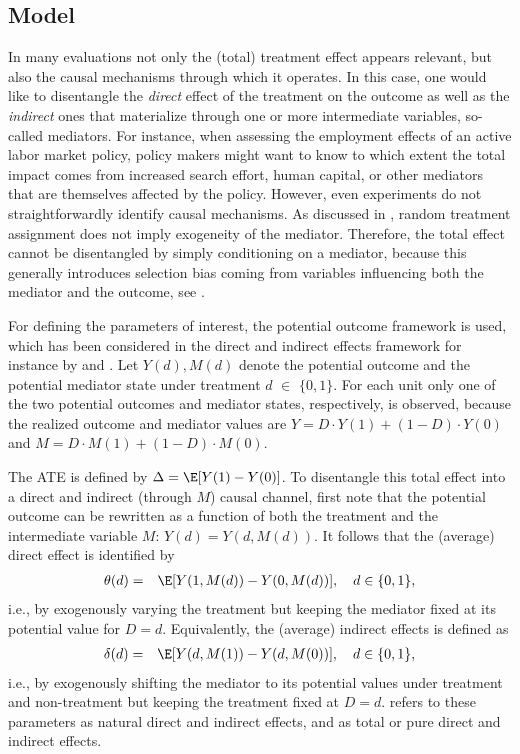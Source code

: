 \documentclass[nojss]{jss}
\begin{document}
\subsection{Model}\label{medmodel}

In many evaluations not only the (total) treatment effect appears relevant, but also the causal mechanisms through which it operates. In this case, one would like to disentangle the \emph{direct} effect of the treatment on the outcome as well as the \emph{indirect} ones that materialize through one or more intermediate variables, so-called mediators. For instance, when assessing the employment effects of an active labor market policy, policy makers might want to know to which extent the total impact comes from increased search effort, human capital, or other mediators that are themselves affected by the policy. However, even experiments do not straightforwardly identify causal mechanisms. As discussed in \citet{RoGr92}, random treatment assignment does not imply exogeneity of the mediator. Therefore, the total effect cannot be disentangled by simply conditioning on a mediator, because this generally introduces selection bias coming from variables influencing both the mediator and the outcome, see \citet{Rosenbaum84}.

For defining the parameters of interest, the potential outcome framework is used, which has been considered in the direct and indirect effects framework for instance by \citet{Ru04} and \citet{Albert2008}. Let $Y(d), M(d)$ denote the potential outcome and the potential mediator state under treatment $d$ $\in$ $\{0,1\}$. For each unit only one of the two potential outcomes and mediator states, respectively, is observed, because the realized outcome and mediator values are $Y=D\cdot Y(1) + (1-D)\cdot Y(0)$ and $M=D\cdot M(1) + (1-D)\cdot M(0)$.

The ATE is defined by $\Delta=\E[Y(1)-Y(0)]$. To disentangle this total effect into a direct and indirect (through $M$) causal channel, first note that the potential outcome can be rewritten as a function of both the treatment and the intermediate variable $M$: $Y(d)=Y(d,M(d))$. It follows that the (average) direct effect is identified by
\begin{eqnarray}
\theta (d) &=& \E[Y(1,M(d))-Y(0,M(d))],\quad d\in\{0,1\},
\end{eqnarray}
i.e., by exogenously varying the treatment but keeping the mediator fixed at its potential value for $D=d$. Equivalently, the (average) indirect effects is defined as
\begin{eqnarray}
\delta (d) &=& \E[Y(d,M(1))-Y(d,M(0))],\quad d\in\{0,1\},
\end{eqnarray}
i.e., by exogenously shifting the mediator to its potential values under treatment and non-treatment but keeping the treatment fixed at $D=d$. \citet{Pearl01} refers to these parameters as natural direct and indirect effects, \citet{RoGr92} and \citet{Robins2003} as total or pure direct and indirect effects.
\end{document}
